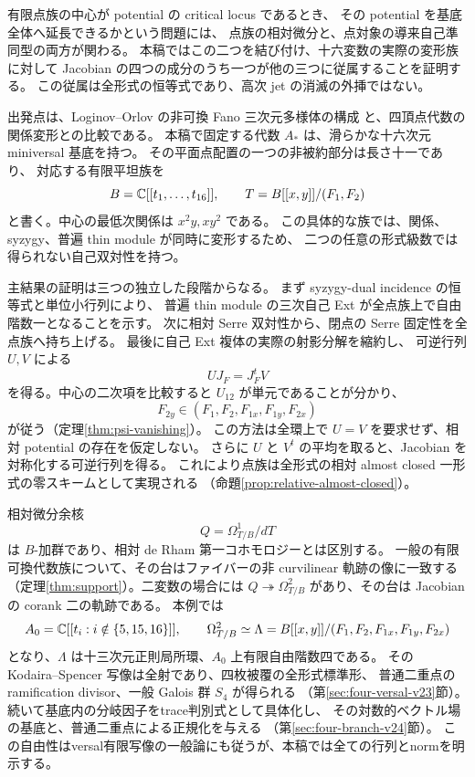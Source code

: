 有限点族の中心が potential の critical locus であるとき、
その potential を基底全体へ延長できるかという問題には、
点族の相対微分と、点対象の導来自己準同型の両方が関わる。
本稿ではこの二つを結び付け、十六変数の実際の変形族に対して
Jacobian の四つの成分のうち一つが他の三つに従属することを証明する。
この従属は全形式の恒等式であり、高次 jet の消滅の外挿ではない。

出発点は、Loginov--Orlov の非可換 Fano 三次元多様体の構成
\cite{LO}と、四頂点代数の関係変形との比較である。
本稿で固定する代数 $A_*$ は、滑らかな十六次元 miniversal 基底を持つ。
その平面点配置の一つの非被約部分は長さ十一であり、
対応する有限平坦族を
\[
 B=\mathbb C[[t_1,\ldots,t_{16}]],\qquad
 T=B[[x,y]]/(F_1,F_2)
\]
と書く。中心の最低次関係は $x^2y,xy^2$ である。
この具体的な族では、関係、syzygy、普遍 thin module が同時に変形するため、
二つの任意の形式級数では得られない自己双対性を持つ。

主結果の証明は三つの独立した段階からなる。
まず syzygy-dual incidence の恒等式と単位小行列により、
普遍 thin module の三次自己 Ext が全点族上で自由階数一となることを示す。
次に相対 Serre 双対性から、閉点の Serre 固定性を全点族へ持ち上げる。
最後に自己 Ext 複体の実際の射影分解を縮約し、
可逆行列 $U,V$ による
\[
 UJ_F=J_F^tV
\]
を得る。中心の二次項を比較すると $U_{12}$ が単元であることが分かり、
\[
 F_{2y}\in(F_1,F_2,F_{1x},F_{1y},F_{2x})
\]
が従う（定理\ref{thm:psi-vanishing}）。
この方法は全環上で $U=V$ を要求せず、相対 potential の存在を仮定しない。
さらに $U$ と $V^t$ の平均を取ると、Jacobian を対称化する可逆行列を得る。
これにより点族は全形式の相対 almost closed 一形式の零スキームとして実現される
（命題\ref{prop:relative-almost-closed}）。

相対微分余核
\[
 Q=\Omega^1_{T/B}/dT
\]
は $B$-加群であり、相対 de Rham 第一コホモロジーとは区別する。
一般の有限可換代数族について、その台はファイバーの非 curvilinear 軌跡の像に一致する
（定理\ref{thm:support}）。二変数の場合には
$Q\twoheadrightarrow\Omega^2_{T/B}$ があり、その台は Jacobian の corank 二の軌跡である。
本例では
\[
 A_0=\mathbb C[[t_i:i\notin\{5,15,16\}]],\qquad
 \Omega^2_{T/B}\simeq\Lambda
 =B[[x,y]]/(F_1,F_2,F_{1x},F_{1y},F_{2x})
\]
となり、$\Lambda$ は十三次元正則局所環、$A_0$ 上有限自由階数四である。
その Kodaira--Spencer 写像は全射であり、四枚被覆の全形式標準形、
普通二重点の ramification divisor、一般 Galois 群 $S_4$ が得られる
（第\ref{sec:four-versal-v23}節）。
続いて基底内の分岐因子をtrace判別式として具体化し、
その対数的ベクトル場の基底と、普通二重点による正規化を与える
（第\ref{sec:four-branch-v24}節）。
この自由性はversal有限写像の一般論にも従うが、本稿では全ての行列とnormを明示する。

